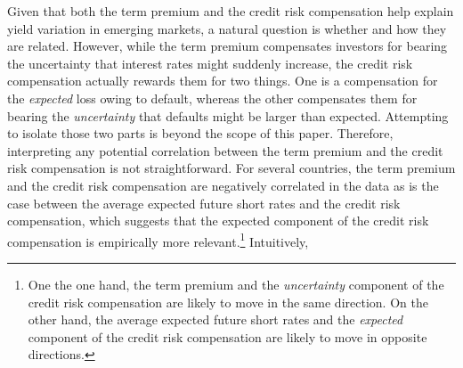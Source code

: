 {%
Given that both the term premium and the credit risk compensation help explain yield variation in emerging markets, a natural question is whether and how they are related.
However, while the term premium compensates investors for bearing the uncertainty that interest rates might suddenly increase, the credit risk compensation actually rewards them for two things. 
One is a compensation for the \textit{expected} loss owing to default, whereas the other compensates them for bearing the \textit{uncertainty} that defaults might be larger than expected. 
Attempting to isolate those two parts is beyond the scope of this paper.
Therefore, interpreting any potential correlation between the term premium and the credit risk compensation is not straightforward.
For several countries, the term premium and the credit risk compensation are negatively correlated in the data as is the case between the average expected future short rates and the credit risk compensation, which suggests that the expected component of the credit risk compensation is empirically more relevant.\footnote{ One the one hand, the term premium and the \textit{uncertainty} component of the credit risk compensation are likely to move in the same direction. On the other hand, the average expected future short rates and the \textit{expected} component of the credit risk compensation are likely to move in opposite directions.}
Intuitively, %
}
